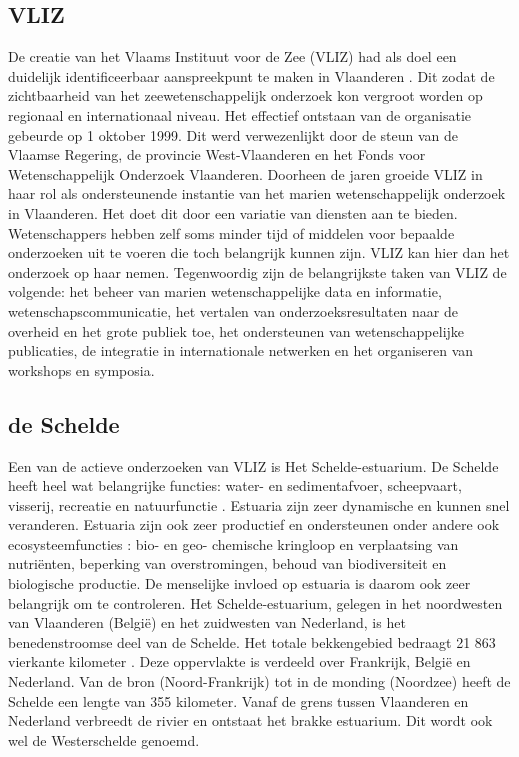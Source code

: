 \subsection{VLIZ}
De creatie van het Vlaams Instituut voor de Zee (VLIZ) had als doel een duidelijk identificeerbaar aanspreekpunt te maken in Vlaanderen \autocite{Mees2012}. Dit zodat de zichtbaarheid van het zeewetenschappelijk onderzoek kon vergroot worden op regionaal en internationaal niveau. Het effectief ontstaan van de organisatie gebeurde op 1 oktober 1999. Dit werd verwezenlijkt door de steun van de Vlaamse Regering, de provincie West-Vlaanderen en het Fonds voor Wetenschappelijk Onderzoek Vlaanderen. Doorheen de jaren groeide VLIZ in haar rol als ondersteunende instantie van het marien wetenschappelijk onderzoek in Vlaanderen. Het doet dit door een variatie van diensten aan te bieden. Wetenschappers hebben zelf soms minder tijd of middelen voor bepaalde onderzoeken uit te voeren die toch belangrijk kunnen zijn. VLIZ kan hier dan het onderzoek op haar nemen. Tegenwoordig zijn de belangrijkste taken van VLIZ de volgende: het beheer van marien wetenschappelijke data en informatie, wetenschapscommunicatie, het vertalen van onderzoeksresultaten naar de overheid en het grote publiek toe, het ondersteunen van wetenschappelijke publicaties, de integratie in internationale netwerken en het organiseren van workshops en symposia.

\subsection{de Schelde}
Een van de actieve onderzoeken van VLIZ is Het Schelde-estuarium. De Schelde heeft heel wat belangrijke functies: water- en sedimentafvoer, scheepvaart, visserij, recreatie en natuurfunctie \autocite{Melrel1992}. Estuaria zijn zeer dynamische en kunnen snel veranderen. Estuaria zijn ook zeer productief en ondersteunen onder andere ook ecosysteemfuncties \autocite{Meire2005}: bio- en geo- chemische kringloop en verplaatsing van nutriënten, beperking van overstromingen, behoud van biodiversiteit en biologische productie. De menselijke invloed op estuaria is daarom ook zeer belangrijk om te controleren. Het Schelde-estuarium, gelegen in het noordwesten van Vlaanderen (België) en het zuidwesten van Nederland, is het benedenstroomse deel van de Schelde. Het totale bekkengebied bedraagt 21 863 vierkante kilometer \autocite{Peeters2015}. Deze oppervlakte is verdeeld over Frankrijk, België en Nederland. Van de bron (Noord-Frankrijk) tot in de monding (Noordzee) heeft de Schelde een lengte van 355 kilometer. Vanaf de grens tussen Vlaanderen en Nederland verbreedt de rivier en ontstaat het brakke estuarium. Dit wordt ook wel de Westerschelde genoemd.

